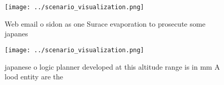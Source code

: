 \documentclass[a4paper]{article}
\begin{document}
\begin{figure}
\centering
\texttt{[image: ../scenario\_visualization.png]}
\caption{Web email o sidon as one Surace evaporation to prosecute some japanes
}
\end{figure}
 
\begin{figure}
\centering
\texttt{[image: ../scenario\_visualization.png]}
\caption{ japanese o logic planner developed at this altitude range is in mm A lood entity are the
}
\end{figure}
 
\end{document}
